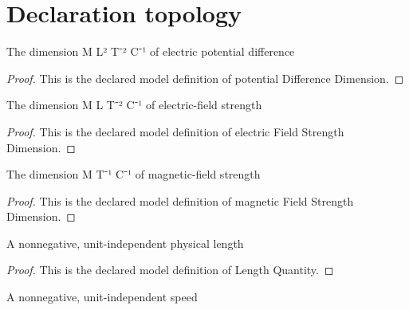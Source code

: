 \section{Declaration topology}
\begin{definition}
  \label{def:physics:phyx-mini-0639:phyxminiproblems-problemphyxmini0639-potentialdifferencedimension}
  The dimension M L² T⁻² C⁻¹ of electric potential difference
\end{definition}
\begin{proof}
  This is the declared model definition of potential Difference Dimension.
\end{proof}
\begin{definition}
  \label{def:physics:phyx-mini-0639:phyxminiproblems-problemphyxmini0639-electricfieldstrengthdimension}
  The dimension M L T⁻² C⁻¹ of electric-field strength
\end{definition}
\begin{proof}
  This is the declared model definition of electric Field Strength Dimension.
\end{proof}
\begin{definition}
  \label{def:physics:phyx-mini-0639:phyxminiproblems-problemphyxmini0639-magneticfieldstrengthdimension}
  The dimension M T⁻¹ C⁻¹ of magnetic-field strength
\end{definition}
\begin{proof}
  This is the declared model definition of magnetic Field Strength Dimension.
\end{proof}
\begin{definition}
  \label{def:physics:phyx-mini-0639:phyxminiproblems-problemphyxmini0639-lengthquantity}
  A nonnegative, unit-independent physical length
\end{definition}
\begin{proof}
  This is the declared model definition of Length Quantity.
\end{proof}
\begin{definition}
  \label{def:physics:phyx-mini-0639:phyxminiproblems-problemphyxmini0639-speedquantity}
  A nonnegative, unit-independent speed
\end{definition}
